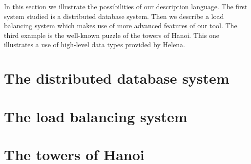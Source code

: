 In this section we illustrate the possibilities of our description
language.  The first system studied is a distributed database system.
Then we describe a load balancing system which makes use of more
advanced features of our tool.  The third example is the well-known
puzzle of the towers of Hanoi.  This one illustrates a use of
high-level data types provided by Helena.

\section{The distributed database system}
\section{The load balancing system}
\section{The towers of Hanoi}
